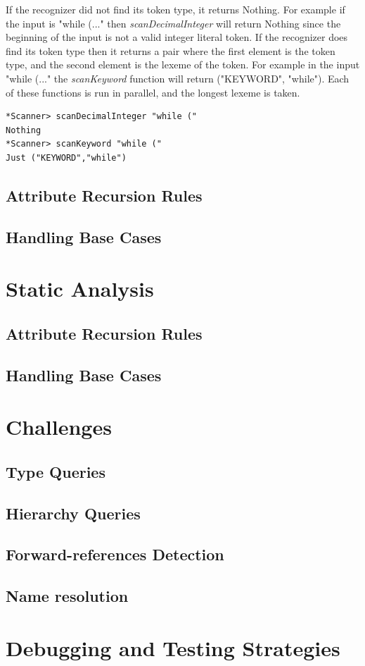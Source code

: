 \documentclass[12pt,letterpaper]{article}
\begin{document}
If the recognizer did not find its token type, it returns Nothing. For example if the input is "while (..." then \emph{scanDecimalInteger} will return Nothing since the beginning of the input is not a valid integer literal token. If the recognizer does find its token type then it returns a pair where the first element is the token type, and the second element is the lexeme of the token. For example in the input "while (..." the \emph{scanKeyword} function will return ("KEYWORD", "while"). Each of these functions is run in parallel, and the longest lexeme is taken.
\begin{lstlisting}
*Scanner> scanDecimalInteger "while ("
Nothing
*Scanner> scanKeyword "while ("
Just ("KEYWORD","while")
\end{lstlisting}

\subsection{Attribute Recursion Rules}
\subsection{Handling Base Cases}

\section{Static Analysis}

\subsection{Attribute Recursion Rules}
\subsection{Handling Base Cases}


\section{Challenges}
\subsection{Type Queries}
\subsection{Hierarchy Queries}
\subsection{Forward-references Detection}
\subsection{Name resolution}
\section{Debugging and Testing Strategies}
\end{document}
